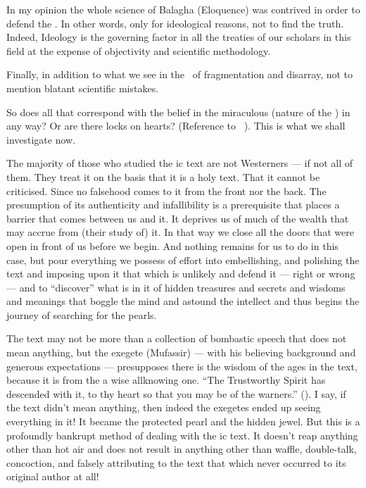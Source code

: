 \documentclass[12pt]{memoir}
\begin{document}
In my opinion the whole science of Balagha (Eloquence)
was contrived in order to defend the \Quran.
In other words, only for ideological reasons, not to find the truth.
Indeed, Ideology is the governing factor in all the treaties of our scholars
in this field at the expense of objectivity and scientific methodology.

Finally, in addition to what we see in the \Quran\ of fragmentation
and disarray, not to mention blatant scientific mistakes.

So does all that correspond with the belief in the miraculous
(nature of the \Quran) in any way?
Or are there locks on hearts?
(Reference to \Quran\ ).
This is what we shall investigate now.

The majority of those who studied the \Quran{}ic text are not Westerners —
if not all of them.
They treat it on the basis that it is a holy text.
That it cannot be criticised.
Since no falsehood comes to it from the front nor the back.
The presumption of its authenticity and infallibility is a prerequisite
that places a barrier that comes between us and it.
It deprives us of much of the wealth that may accrue from (their study of) it.
In that way we close all the doors that were open
in front of us before we begin.
And nothing remains for us to do in this case,
but pour everything we possess of effort into embellishing,
and polishing the text and imposing upon it
that which is unlikely and defend it — right or wrong —
and to “discover” what is in it of hidden treasures and secrets and
wisdoms and meanings that boggle the mind and astound the intellect and
thus begins the journey of searching for the pearls.

The text may not be more than a collection of bombastic speech
that does not mean anything, but the exegete (Mufassir) —
with his believing background and generous expectations —
presupposes there is the wisdom of the ages in the text,
because it is from the a wise all\–knowing one.
“The Trustworthy Spirit has descended with it,
to thy heart so that you may be of the warners.” ().
I say, if the text didn’t mean anything,
then indeed the exegetes ended up seeing everything in it!
It became the protected pearl and the hidden jewel.
But this is a profoundly bankrupt method of dealing with the \Quran{}ic text.
It doesn’t reap anything other than hot air and does not result
in anything other than waffle, double-talk, concoction,
and falsely attributing to the text that
which never occurred to its original author at all!
\end{document}
